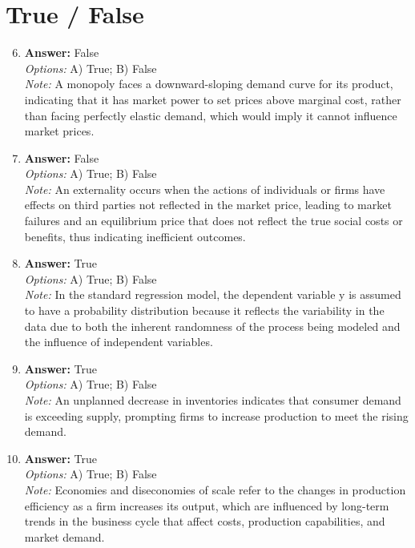 \documentclass[12pt]{article}
\begin{document}
\section*{True / False}
\begin{enumerate}[label=\arabic*.]
\setcounter{enumi}{5}
\item \textbf{Answer:} False
\\ \textit{Options:} A) True; B) False
\\ \textit{Note:} A monopoly faces a downward-sloping demand curve for its product, indicating that it has market power to set prices above marginal cost, rather than facing perfectly elastic demand, which would imply it cannot influence market prices.
\item \textbf{Answer:} False
\\ \textit{Options:} A) True; B) False
\\ \textit{Note:} An externality occurs when the actions of individuals or firms have effects on third parties not reflected in the market price, leading to market failures and an equilibrium price that does not reflect the true social costs or benefits, thus indicating inefficient outcomes.
\item \textbf{Answer:} True
\\ \textit{Options:} A) True; B) False
\\ \textit{Note:} In the standard regression model, the dependent variable y is assumed to have a probability distribution because it reflects the variability in the data due to both the inherent randomness of the process being modeled and the influence of independent variables.
\item \textbf{Answer:} True
\\ \textit{Options:} A) True; B) False
\\ \textit{Note:} An unplanned decrease in inventories indicates that consumer demand is exceeding supply, prompting firms to increase production to meet the rising demand.
\item \textbf{Answer:} True
\\ \textit{Options:} A) True; B) False
\\ \textit{Note:} Economies and diseconomies of scale refer to the changes in production efficiency as a firm increases its output, which are influenced by long-term trends in the business cycle that affect costs, production capabilities, and market demand.
\end{enumerate}
\end{document}
